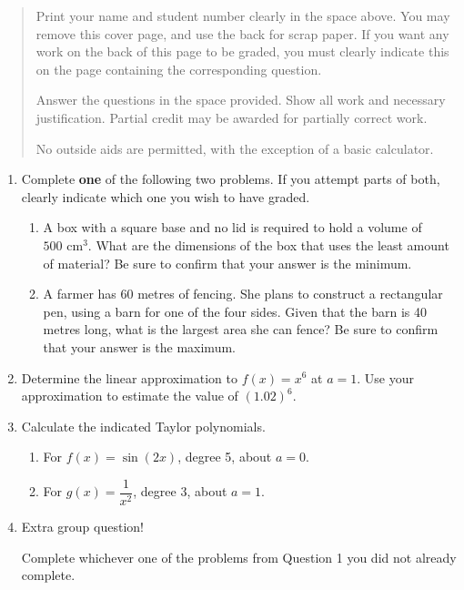 \documentclass[12pt]{article}
\newcommand{\points}[1]{\marginpar{\hspace{24pt}[#1]}}
\begin{document}
\vspace{0.1in}

\vspace*{\fill}

\begin{quote}
Print your name and student number clearly in the space above. You may remove this cover page, and use the back for scrap paper. If you want any work on the back of this page to be graded, you must clearly indicate this on the page containing the corresponding question.

\medskip

Answer the questions in the space provided. Show all work and necessary justification. Partial credit may be awarded for partially correct work.
 
\medskip

No outside aids are permitted, with the exception of a basic calculator. 
\end{quote}





\newpage

 \begin{enumerate}
 \item Complete \textbf{one} of the following two problems. If you attempt parts of both, clearly indicate which one you wish to have graded. \points{8}
 \begin{enumerate}
 \item A box with a square base and no lid is required to hold a volume of $500 \text{ cm}^3$. What are the dimensions of the box that uses the least amount of material? Be sure to confirm that your answer is the minimum.
 \item A farmer has 60 metres of fencing. She plans to construct a rectangular pen, using a barn for one of the four sides. Given that the barn is 40 metres long, what is the largest area she can fence? Be sure to confirm that your answer is the maximum.
 \end{enumerate}
 
 \newpage
 
 
 \item Determine the linear approximation to $f(x)=x^6$ at $a=1$. Use your approximation to estimate the value of $(1.02)^6$. \points{4}
 
 \vspace{2.5in}
 
 \item Calculate the indicated Taylor polynomials. 
 \begin{enumerate}
 \item For $f(x)= \sin(2x)$, degree 5, about $a=0$. \points{3}
 
 \vspace{2.5in}
 
 \item For $g(x) = \dfrac{1}{x^2}$, degree 3, about $a=1$. \points{3}
 \end{enumerate}
 \newpage
 
 \item Extra group question! \points{4}
 
 Complete whichever one of the problems from Question 1 you did not already complete.
\end{enumerate}
\end{document}
